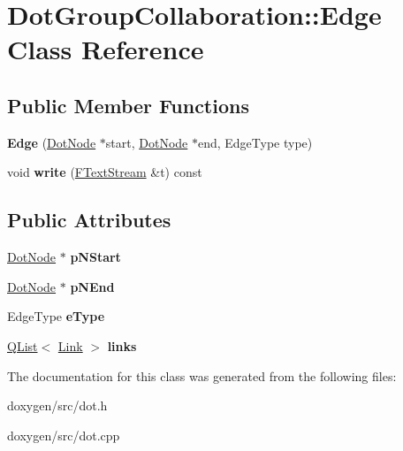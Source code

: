 \hypertarget{class_dot_group_collaboration_1_1_edge}{}\section{Dot\+Group\+Collaboration\+::Edge Class Reference}
\label{class_dot_group_collaboration_1_1_edge}
\subsection*{Public Member Functions}
\begin{DoxyCompactItemize}
\item 
\mbox{\label{class_dot_group_collaboration_1_1_edge_a72ac56ac966b6ab1f983c728e99f9608}} 
{\bfseries Edge} (\mbox{\hyperlink{class_dot_node}{Dot\+Node}} $\ast$start, \mbox{\hyperlink{class_dot_node}{Dot\+Node}} $\ast$end, Edge\+Type type)
\item 
\mbox{\label{class_dot_group_collaboration_1_1_edge_a90f69d7de9cc9067a82a93feeee388d9}} 
void {\bfseries write} (\mbox{\hyperlink{class_f_text_stream}{F\+Text\+Stream}} \&t) const
\end{DoxyCompactItemize}
\subsection*{Public Attributes}
\begin{DoxyCompactItemize}
\item 
\mbox{\label{class_dot_group_collaboration_1_1_edge_a05c8193b7ab3fa66b1cfe1c7bd87e1d2}} 
\mbox{\hyperlink{class_dot_node}{Dot\+Node}} $\ast$ {\bfseries p\+N\+Start}
\item 
\mbox{\label{class_dot_group_collaboration_1_1_edge_aaa1b8e53e4a95e63acde11b161331e11}} 
\mbox{\hyperlink{class_dot_node}{Dot\+Node}} $\ast$ {\bfseries p\+N\+End}
\item 
\mbox{\label{class_dot_group_collaboration_1_1_edge_a76a2ba25cd605e65eece591f41706626}} 
Edge\+Type {\bfseries e\+Type}
\item 
\mbox{\label{class_dot_group_collaboration_1_1_edge_af8c82f23e5a2e9f3845fa402864eb6dd}} 
\mbox{\hyperlink{class_q_list}{Q\+List}}$<$ \mbox{\hyperlink{class_dot_group_collaboration_1_1_link}{Link}} $>$ {\bfseries links}
\end{DoxyCompactItemize}


The documentation for this class was generated from the following files\+:\begin{DoxyCompactItemize}
\item 
doxygen/src/dot.\+h\item 
doxygen/src/dot.\+cpp\end{DoxyCompactItemize}
